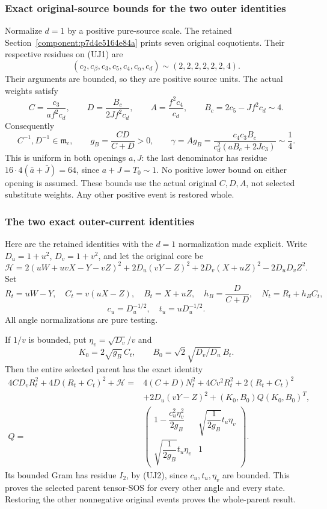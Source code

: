 \subsubsection*{Exact original-source bounds for the two outer identities}

Normalize $d=1$ by a positive pure-source scale. The retained
Section~\ref{component:p7d4e5164e84a} prints seven original coquotients.
Their respective residues on (UJ1) are
\[
 (c_2,c_\beta,c_3,c_5,c_4,c_\alpha,c_d)
                    \sim(2,2,2,2,2,2,4).
\]
Their arguments are bounded, so they are positive source units.
The actual weights satisfy
\[
 C=\frac{c_3}{af^2c_d},\qquad
 D=\frac{B_c}{2Jf^2c_d},\qquad A=\frac{f^2c_4}{c_d},
 \qquad B_c=2c_5-Jf^2c_d\sim4.
\]
Consequently
\[
 C^{-1},D^{-1}\in\mathfrak m_c,\qquad
 g_B=\frac{CD}{C+D}>0,\qquad
 \gamma=A g_B=
 \frac{c_4c_3B_c}{c_d^2(aB_c+2Jc_3)}\sim\frac14.
                                                               \tag{UJ2}
\]
This is uniform in both openings $a,J$: the last denominator has
residue $16\cdot4(\bar a+\bar J)=64$, since $a+J=T_0\sim1$.
No positive lower bound on either opening is assumed.
These bounds use the actual original $C,D,A$, not selected
substitute weights. Any other positive event is restored whole.

\subsubsection*{The two exact outer-current identities}

Here are the retained identities with the $d=1$ normalization made
explicit. Write $D_u=1+u^2$, $D_v=1+v^2$, and let the original core be
\[
 \mathcal H=
 2(uW+uvX-Y-vZ)^2+2D_u(vY-Z)^2
 +2D_v(X+uZ)^2-2D_uD_vZ^2.
\]
Set
\[
 R_t=uW-Y,\quad C_t=v(uX-Z),\quad B_t=X+uZ,
 \quad h_B=\frac D{C+D},\quad N_t=R_t+h_BC_t,
\]
\[
 c_u=D_u^{-1/2},\quad t_u=uD_u^{-1/2}.
\]
All angle normalizations are pure testing.

If $1/v$ is bounded, put $\eta_v=\sqrt{D_v}/v$ and
\[
 K_0=2\sqrt{g_B}\,C_t,\qquad
 B_0=\sqrt2\sqrt{D_v/D_u}\,B_t.
\]
Then the entire selected parent has the exact identity
\[
\begin{split}
 4CD_vR_t^2+4D(R_t+C_t)^2+\mathcal H
 ={}&4(C+D)N_t^2+4Cv^2R_t^2+2(R_t+C_t)^2\\
 &+2D_u(vY-Z)^2+(K_0,B_0)Q(K_0,B_0)^T,\\
 Q={}&
 \begin{pmatrix}
 1-\dfrac{c_u^2\eta_v^2}{2g_B}&
          \sqrt{\dfrac1{2g_B}}t_u\eta_v\\
 \sqrt{\dfrac1{2g_B}}t_u\eta_v&1
 \end{pmatrix}.
\end{split}                                                     \tag{UJ3}
\]
Its bounded Gram has residue $I_2$, by (UJ2), since
$c_u,t_u,\eta_v$ are bounded. This proves the selected parent
tensor-SOS for every other angle and every state. Restoring the
other nonnegative original events proves the whole-parent result.

